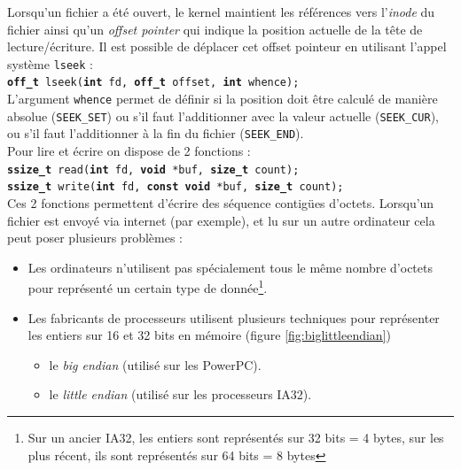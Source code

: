 Lorsqu'un fichier a été ouvert, le kernel maintient les références vers l'\textit{inode} du fichier ainsi qu'un \textit{offset pointer} qui indique la position actuelle de la tête de lecture/écriture. Il est possible de déplacer cet offset pointeur en utilisant l'appel système \texttt{lseek} : \\
\texttt{\textbf{off\_t} lseek(\textbf{int} fd, \textbf{off\_t} offset, \textbf{int} whence);}\\
L'argument \texttt{whence} permet de définir si la position doit être calculé de manière absolue (\texttt{SEEK\_SET}) ou s'il faut l'additionner avec la valeur actuelle (\texttt{SEEK\_CUR}), ou s'il faut l'additionner à la fin du fichier (\texttt{SEEK\_END}).\\

Pour lire et écrire on dispose de 2 fonctions : \\
\texttt{\textbf{ssize\_t} read(\textbf{int} fd, \textbf{void} *buf, \textbf{size\_t} count);}\\
\texttt{\textbf{ssize\_t} write(\textbf{int} fd, \textbf{const} \textbf{void} *buf, \textbf{size\_t} count);}\\
Ces 2 fonctions permettent d'écrire des séquence contigües d'octets. Lorsqu'un fichier est envoyé via internet (par exemple), et lu sur un autre ordinateur cela peut poser plusieurs problèmes :
\begin{itemize}
  \item Les ordinateurs n'utilisent pas spécialement tous le même nombre d'octets pour représenté un certain type de donnée\footnote{Sur un ancier IA32, les entiers sont représentés sur 32 bits = 4 bytes, sur les plus récent, ils sont représentés sur 64 bits = 8 bytes}.
  \item Les fabricants de processeurs utilisent plusieurs techniques pour représenter les entiers sur 16 et 32 bits en mémoire (figure \ref{fig:biglittleendian})
    \begin{itemize}
      \item le \textit{big endian} (utilisé sur les PowerPC).
      \item le \textit{little endian} (utilisé sur les processeurs IA32).
    \end{itemize}
\end{itemize}
